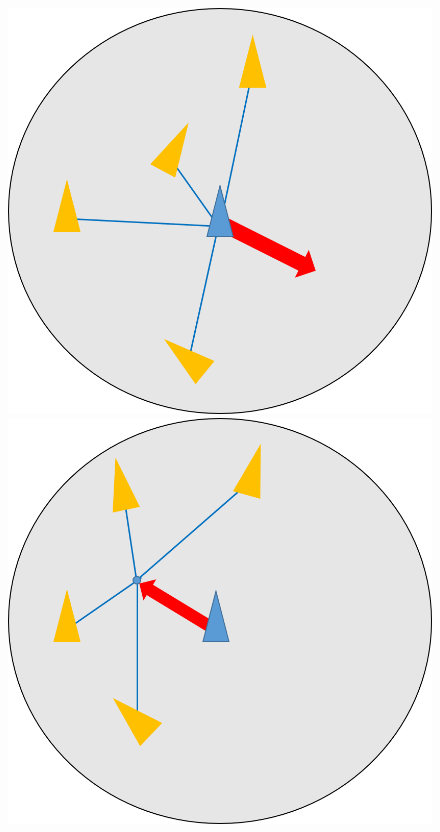 \documentclass[a4paper,11pt]{jarticle}
\begin{document}
	\begin{figure}
		\begin{minipage}{0.3\linewidth}
			\centering
			\includegraphics[width=0.9\linewidth]{png/separation.png}
		\end{minipage}
		\begin{minipage}{0.3\linewidth}
			\centering
			\includegraphics[width=0.9\linewidth]{png/cohesion.png}
		\end{minipage}

\end{figure}
\end{document}
